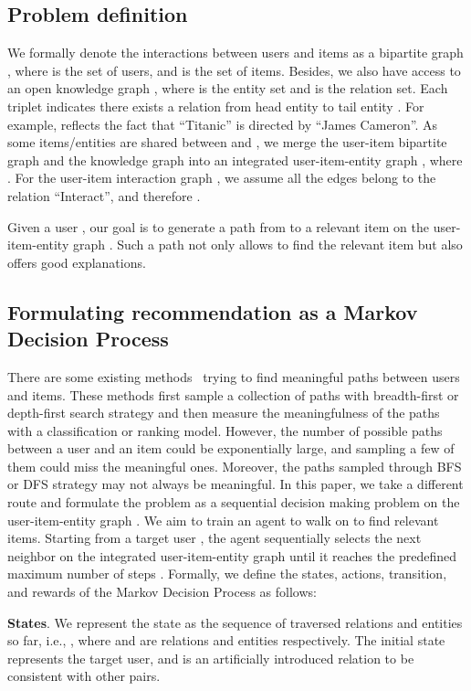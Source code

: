 \documentclass{article}
\newcommand{\xhdr}[1]{{\noindent\bfseries #1}.}
\begin{document}
\subsection{Problem definition}
We formally denote the interactions between users and items as a bipartite graph , where  is the set of users, and  is the set of items. Besides, we also have access to an open knowledge graph , where  is the entity set and  is the relation set. Each triplet  indicates there exists a relation  from head entity  to tail entity . For example,  reflects the fact that ``Titanic'' is directed by ``James Cameron''. 
As some items/entities are shared between  and , we merge the user-item bipartite graph  and the knowledge graph  into an integrated user-item-entity graph , where . For the user-item interaction graph , we assume all the edges belong to the relation ``Interact'', and therefore . 




Given a user , our goal is to generate a path from  to a relevant item  on the user-item-entity graph . Such a path not only allows to find the relevant item but also offers good explanations. 




\subsection{Formulating recommendation as a Markov Decision Process}\label{subsec::mdp}
There are some existing methods~\cite{Wang2018ExplainableRO} trying to find meaningful paths between users and items. These methods first sample a collection of paths with breadth-first or depth-first search strategy and then measure the meaningfulness of the paths with a classification or ranking model. However, the number of possible paths between a user and an item could be exponentially large, and sampling a few of them could miss the meaningful ones. 
Moreover, the paths sampled through BFS or DFS strategy may not always be meaningful. 
In this paper, we take a different route and formulate the problem as a sequential decision making problem on the user-item-entity graph . We aim to train an agent to walk on  to find relevant items.
Starting from a target user , the agent sequentially selects the next neighbor on the integrated user-item-entity graph  until it reaches the predefined maximum number of steps .
Formally, we define the states, actions, transition, and rewards of the Markov Decision Process as follows:

\xhdr{States} We represent the state as the sequence of traversed relations and entities so far, i.e., , where  and  are relations and entities respectively. 
The initial state  represents the target user, and  is an artificially introduced relation to be consistent with other  pairs.
\end{document}
